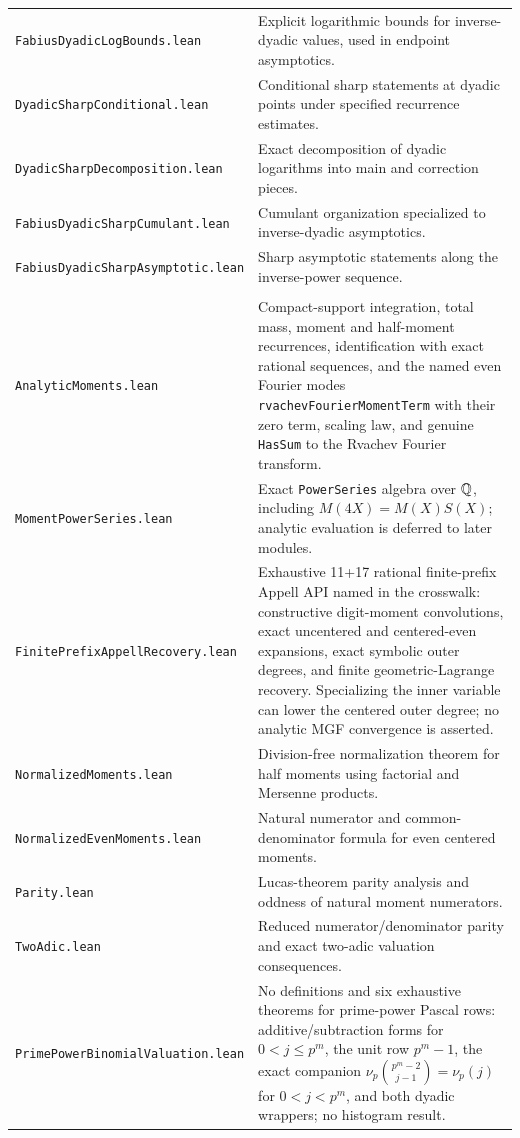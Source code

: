 \documentclass[11pt,oneside]{article}
\theoremstyle{definition}
\theoremstyle{remark}
\begin{document}
\begin{longtable}{>{\raggedright\arraybackslash}p{} >{\raggedright\arraybackslash}p{}}
\nolinkurl{FabiusDyadicLogBounds.lean} & Explicit logarithmic bounds for inverse-dyadic values, used in endpoint asymptotics. \\
\nolinkurl{DyadicSharpConditional.lean} & Conditional sharp statements at dyadic points under specified recurrence estimates. \\
\nolinkurl{DyadicSharpDecomposition.lean} & Exact decomposition of dyadic logarithms into main and correction pieces. \\
\nolinkurl{FabiusDyadicSharpCumulant.lean} & Cumulant organization specialized to inverse-dyadic asymptotics. \\
\nolinkurl{FabiusDyadicSharpAsymptotic.lean} & Sharp asymptotic statements along the inverse-power sequence. \\
\addlinespace[0.45em]
\multicolumn{2}{l}{\textbf{Moments, arithmetic, and denominators}}\\[0.25em]
\nolinkurl{AnalyticMoments.lean} & Compact-support integration, total mass, moment and half-moment recurrences, identification with exact rational sequences, and the named even Fourier modes \nolinkurl{rvachevFourierMomentTerm} with their zero term, scaling law, and genuine \nolinkurl{HasSum} to the Rvachev Fourier transform. \\
\nolinkurl{MomentPowerSeries.lean} & Exact \nolinkurl{PowerSeries} algebra over \(\mathbb{Q}\), including \(M(4X)=M(X)S(X)\); analytic evaluation is deferred to later modules. \\
\nolinkurl{FinitePrefixAppellRecovery.lean} & Exhaustive 11+17 rational finite-prefix Appell API named in the crosswalk: constructive digit-moment convolutions, exact uncentered and centered-even expansions, exact symbolic outer degrees, and finite geometric-Lagrange recovery.  Specializing the inner variable can lower the centered outer degree; no analytic MGF convergence is asserted. \\
\nolinkurl{NormalizedMoments.lean} & Division-free normalization theorem for half moments using factorial and Mersenne products. \\
\nolinkurl{NormalizedEvenMoments.lean} & Natural numerator and common-denominator formula for even centered moments. \\
\nolinkurl{Parity.lean} & Lucas-theorem parity analysis and oddness of natural moment numerators. \\
\nolinkurl{TwoAdic.lean} & Reduced numerator/denominator parity and exact two-adic valuation consequences. \\
\nolinkurl{PrimePowerBinomialValuation.lean} & No definitions and six exhaustive theorems for prime-power Pascal rows: additive/subtraction forms for \(0<j\le p^m\), the unit row \(p^m-1\), the exact companion \(\nu_p\binom{p^m-2}{j-1}=\nu_p(j)\) for \(0<j<p^m\), and both dyadic wrappers; no histogram result. \\

\end{longtable}
\end{document}
